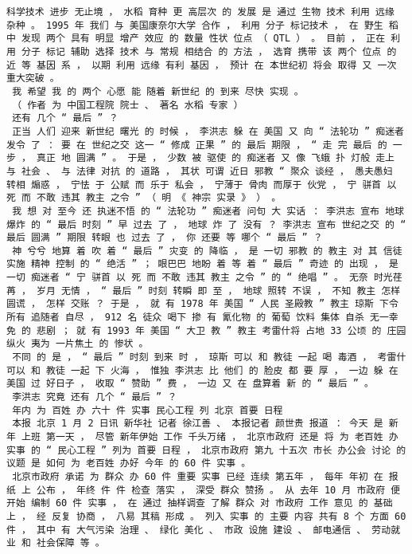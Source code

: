 \documentclass{article}
\begin{document}
\begin{Verbatim}[commandchars=\\\{\}]
 科学技术 进步 无止境 ， 水稻 育种 更 高层次 的 发展 是 通过 生物 技术 利用 远缘 杂种 。 1995 年 我们 与 美国康奈尔大学 合作 ， 利用 分子 标记技术 ， 在 野生 稻中 发现 两个 具有 明显 增产 效应 的 数量 性状 位点 （ QTL ） 。 目前 ， 正在 利用 分子 标记 辅助 选择 技术 与 常规 相结合 的 方法 ， 选育 携带 该 两个 位点 的 近 等 基因 系 ， 以期 利用 远缘 有利 基因 ， 预计 在 本世纪初 将会 取得 又 一次 重大突破 。 
 我 希望 我 的 两个 心愿 能 随着 新世纪 的 到来 尽快 实现 。 
 （ 作者 为 中国工程院 院士 、 著名 水稻 专家 ） 
 还有 几个 “ 最后 ” ？ 
 正当 人们 迎来 新世纪 曙光 的 时候 ， 李洪志 躲 在 美国 又 向 “ 法轮功 ” 痴迷者 发令 了 ： 要 在 世纪之交 这一 “ 修成 正果 ” 的 最后 期限 ， “ 走 完 最后 的 一步 ， 真正 地 圆满 ” 。 于是 ， 少数 被 驱使 的 痴迷者 又 像 飞蛾 扑 灯般 走上 与 社会 、 与 法律 对抗 的 道路 ， 其状 可谓 近日 邪教 “ 聚众 谈经 ， 愚夫愚妇 转相 煽惑 ， 宁怯 于 公赋 而 乐于 私会 ， 宁薄于 骨肉 而厚于 伙党 ， 宁 骈首 以 死 而 不敢 违其 教主 之令 ” （ 明 《 神宗 实录 》 ） 。 
 我 想 对 至今 还 执迷不悟 的 “ 法轮功 ” 痴迷者 问句 大 实话 ： 李洪志 宣布 地球 爆炸 的 “ 最后 时刻 ” 早 过去 了 ， 地球 炸 了 没有 ？ 李洪志 宣布 世纪之交 的 “ 最后 圆满 ” 期限 转眼 也 过去 了 ， 你 还要 等 哪个 “ 最后 ” ？ 
 神 兮兮 地算 着 吹 着 “ 最后 ” 灾变 的 降临 ， 是 一切 邪教 的 教主 对 其 信徒 实施 精神 控制 的 “ 绝活 ” ； 眼巴巴 地盼 着 等 着 “ 最后 ” 奇迹 的 出现 ， 是 一切 痴迷者 “ 宁 骈首 以 死 而 不敢 违其 教主 之令 ” 的 “ 绝唱 ” 。 无奈 时光荏苒 ， 岁月 无情 ， “ 最后 ” 时刻 转瞬 即 至 ， 地球 照转 不误 ， 不知 教主 怎样 圆谎 ， 怎样 交账 ？ 于是 ， 就 有 1978 年 美国 “ 人民 圣殿教 ” 教主 琼斯 下令 所有 追随者 自尽 ， 912 名 徒众 喝下 掺 有 氰化物 的 葡萄 饮料 集体 自杀 无一幸免 的 悲剧 ； 就 有 1993 年 美国 “ 大卫 教 ” 教主 考雷什将 占地 33 公顷 的 庄园 纵火 夷为 一片焦土 的 惨状 。 
 不同 的 是 ， “ 最后 ” 时刻 到来 时 ， 琼斯 可以 和 教徒 一起 喝 毒酒 ， 考雷什 可以 和 教徒 一起 下 火海 ， 惟独 李洪志 比 他们 的 脸皮 都 要 厚 ， 一边 躲 在 美国 过 好日子 ， 收取 “ 赞助 ” 费 ， 一边 又 在 盘算着 新 的 “ 最后 ” 。 
 李洪志 究竟 还有 几个 “ 最后 ” ？ 
 年内 为 百姓 办 六十 件 实事 民心工程 列 北京 首要 日程 
 本报 北京 1 月 2 日讯 新华社 记者 徐江善 、 本报记者 颜世贵 报道 ： 今天 是 新年 上班 第一天 ， 尽管 新年伊始 工作 千头万绪 ， 北京市政府 还是 将 为 老百姓 办实事 的 “ 民心工程 ” 列为 首要 日程 ， 北京市政府 第九 十五次 市长 办公会 讨论 的 议题 是 如何 为 老百姓 办好 今年 的 60 件 实事 。 
 北京市政府 承诺 为 群众 办 60 件 重要 实事 已经 连续 第五年 ， 每年 年初 在 报纸 上 公布 ， 年终 件 件 检查 落实 ， 深受 群众 赞扬 。 从 去年 10 月 市政府 便 开始 编制 60 件 实事 ， 在 通过 抽样调查 了解 群众 对 市政府 工作 意见 的 基础 上 ， 经 反复 协商 ， 八易 其稿 形成 。 列入 实事 的 主要 内容 共有 8 个 方面 60 件 ， 其中 有 大气污染 治理 、 绿化 美化 、 市政 设施 建设 、 邮电通信 、 劳动就业 和 社会保障 等 。 

\end{Verbatim}
\end{document}

